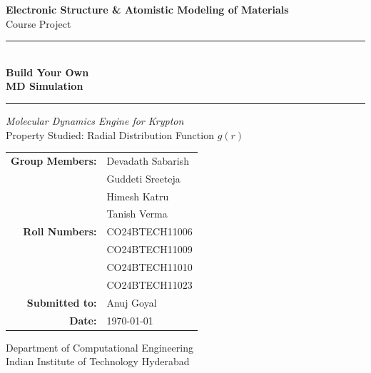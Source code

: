 \documentclass[12pt, a4paper]{article}
\begin{document}
\begin{titlepage}
    \centering
    \vspace*{2cm}

    {\Large\sffamily\bfseries Electronic Structure \& Atomistic Modeling of Materials}\\[0.5em]
    {\large\sffamily Course Project}

    \vspace{1.5cm}
    \rule{\linewidth}{1.5pt}\\[0.4em]
    {\Huge\bfseries\sffamily Build Your Own\\[0.3em] MD Simulation}\\[0.4em]
    \rule{\linewidth}{1.5pt}

    \vspace{1.5cm}
    {\large\itshape Molecular Dynamics Engine for Krypton}\\[0.3em]
    {\normalsize Property Studied: Radial Distribution Function $g(r)$}

    \vspace{2cm}
    \begin{tabular}{rl}
        \textbf{Group Members:} & Devadath Sabarish \\
                                & Guddeti Sreeteja \\
                                & Himesh Katru \\
                                & Tanish Verma \\[1em]
        \textbf{Roll Numbers:}  & CO24BTECH11006 \\
        & CO24BTECH11009 \\
        & CO24BTECH11010 \\
        & CO24BTECH11023 \\[1em]
        \textbf{Submitted to:}  & Anuj Goyal \\[1em]
        \textbf{Date:}          & \today \\
    \end{tabular}

    \vfill
    {\small Department of Computational Engineering\\[0.2em]
    Indian Institute of Technology Hyderabad}
\end{titlepage}



\newpage
{}
\tableofcontents*
\newpage
\end{document}
